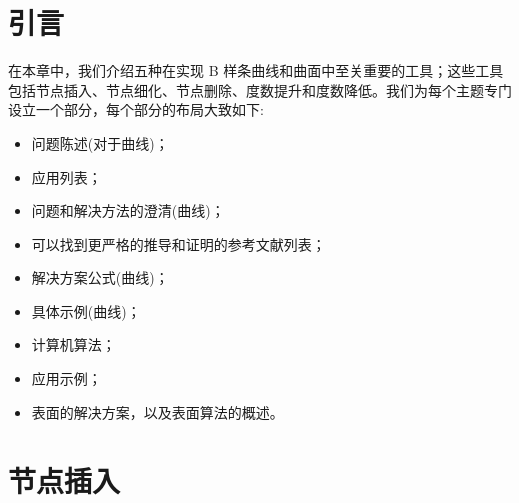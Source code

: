 \documentclass[../main.tex]{subfiles}
\begin{document}
\section{引言}

在本章中，我们介绍五种在实现 B 样条曲线和曲面中至关重要的工具；这些工具包括节点插入、节点细化、节点删除、度数提升和度数降低。我们为每个主题专门设立一个部分，每个部分的布局大致如下:

\begin{itemize}
\item 问题陈述(对于曲线)；
\end{itemize}

\begin{itemize}
\item 应用列表；
\end{itemize}

\begin{itemize}
\item 问题和解决方法的澄清(曲线)；
\end{itemize}

\begin{itemize}
\item 可以找到更严格的推导和证明的参考文献列表；
\end{itemize}

\begin{itemize}
\item 解决方案公式(曲线)；
\end{itemize}

\begin{itemize}
\item 具体示例(曲线)；
\end{itemize}

\begin{itemize}
\item 计算机算法；
\end{itemize}

\begin{itemize}
\item 应用示例；
\end{itemize}

\begin{itemize}
\item 表面的解决方案，以及表面算法的概述。
\end{itemize}



\section{节点插入}
\end{document}
